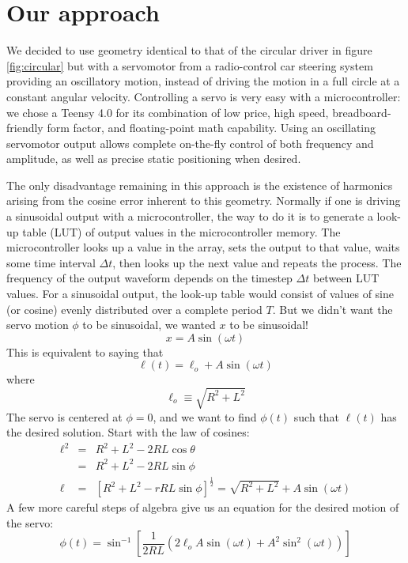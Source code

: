 \documentclass[prb,preprint]{revtex4-1}
\begin{document}
\section{Our approach}
We decided to use geometry identical to that of the circular driver in figure \ref{fig:circular} but with a servomotor from a radio-control car steering system providing an oscillatory motion, instead of driving the motion in a full circle at a constant angular velocity. 
Controlling a servo is very easy with a microcontroller: we chose a Teensy 4.0 for its combination of low price, high speed, breadboard-friendly form factor, and floating-point math capability.
Using an oscillating servomotor output allows complete on-the-fly control of both frequency and amplitude, as well as precise static positioning when desired. 

The only disadvantage remaining in this approach is the existence of harmonics arising from the cosine error inherent to this geometry. 
Normally if one is driving a sinusoidal output with a microcontroller, the way to do it is to generate a look-up table (LUT) of output values in the microcontroller memory.
The microcontroller looks up a value in the array, sets the output to that value, waits some time interval $\Delta t$, then looks up the next value and repeats the process. 
The frequency of the output waveform depends on the timestep $\Delta t$ between LUT values.
For a sinusoidal output, the look-up table would consist of values of sine (or cosine) evenly distributed over a complete period $T$.
But we didn't want the servo motion $\phi$ to be sinusoidal, we wanted $x$ to be sinusoidal!
\begin{equation}
	x = A \sin(\omega t) 
\end{equation}
This is equivalent to saying that
\begin{equation}
	\ell(t) = \ell_o + A \sin(\omega t)
\end{equation}
where 
\begin{equation}
	\ell_o \equiv \sqrt{R^2+L^2}
\end{equation}
The servo is centered at $\phi=0$, and we want to find $\phi(t)$ such that $\ell(t)$ has the desired solution.
Start with the law of cosines:
\begin{eqnarray} 
	\ell^2 &=& R^2 + L^2 - 2 R L \cos\theta\\
		&=& R^2 + L^2 - 2 R L \sin\phi\\
	\ell &=& \left[ R^2+L^2 - r R L \sin\phi \right]^{\frac{1}{2}} = \sqrt{R^2+L^2} + A \sin(\omega t)
\end{eqnarray}
A few more careful steps of algebra give us an equation for the desired motion of the servo:
\begin{equation} \label{eq:phi}
	\phi(t) = \sin^{-1} \left[\frac{1}{2RL}\left(2\ell_o A\sin(\omega t) + A^2 \sin^2(\omega t)\right)\right]
\end{equation}
\end{document}
